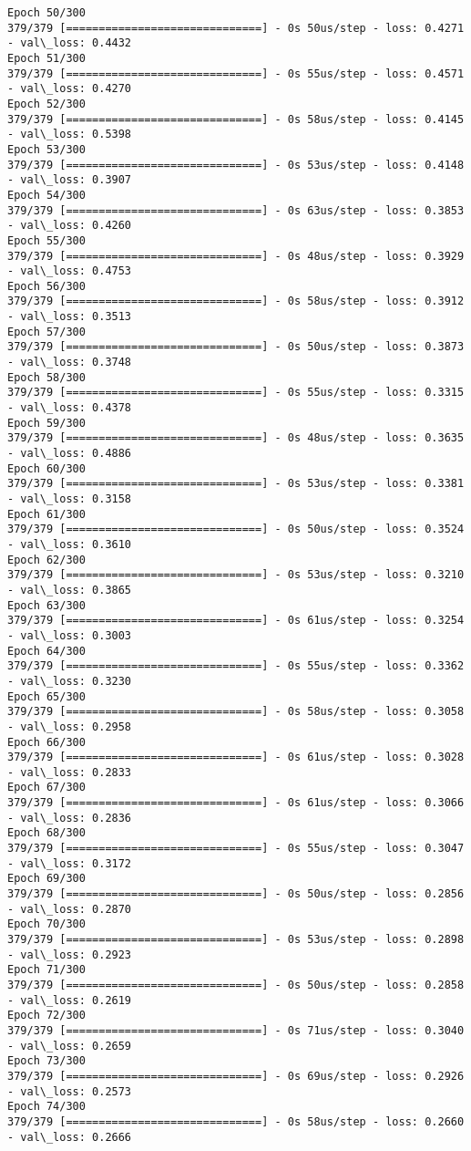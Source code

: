 \documentclass[11pt]{article}
\begin{document}
\begin{Verbatim}[commandchars=\\\{\}]
Epoch 50/300
379/379 [==============================] - 0s 50us/step - loss: 0.4271 - val\_loss: 0.4432
Epoch 51/300
379/379 [==============================] - 0s 55us/step - loss: 0.4571 - val\_loss: 0.4270
Epoch 52/300
379/379 [==============================] - 0s 58us/step - loss: 0.4145 - val\_loss: 0.5398
Epoch 53/300
379/379 [==============================] - 0s 53us/step - loss: 0.4148 - val\_loss: 0.3907
Epoch 54/300
379/379 [==============================] - 0s 63us/step - loss: 0.3853 - val\_loss: 0.4260
Epoch 55/300
379/379 [==============================] - 0s 48us/step - loss: 0.3929 - val\_loss: 0.4753
Epoch 56/300
379/379 [==============================] - 0s 58us/step - loss: 0.3912 - val\_loss: 0.3513
Epoch 57/300
379/379 [==============================] - 0s 50us/step - loss: 0.3873 - val\_loss: 0.3748
Epoch 58/300
379/379 [==============================] - 0s 55us/step - loss: 0.3315 - val\_loss: 0.4378
Epoch 59/300
379/379 [==============================] - 0s 48us/step - loss: 0.3635 - val\_loss: 0.4886
Epoch 60/300
379/379 [==============================] - 0s 53us/step - loss: 0.3381 - val\_loss: 0.3158
Epoch 61/300
379/379 [==============================] - 0s 50us/step - loss: 0.3524 - val\_loss: 0.3610
Epoch 62/300
379/379 [==============================] - 0s 53us/step - loss: 0.3210 - val\_loss: 0.3865
Epoch 63/300
379/379 [==============================] - 0s 61us/step - loss: 0.3254 - val\_loss: 0.3003
Epoch 64/300
379/379 [==============================] - 0s 55us/step - loss: 0.3362 - val\_loss: 0.3230
Epoch 65/300
379/379 [==============================] - 0s 58us/step - loss: 0.3058 - val\_loss: 0.2958
Epoch 66/300
379/379 [==============================] - 0s 61us/step - loss: 0.3028 - val\_loss: 0.2833
Epoch 67/300
379/379 [==============================] - 0s 61us/step - loss: 0.3066 - val\_loss: 0.2836
Epoch 68/300
379/379 [==============================] - 0s 55us/step - loss: 0.3047 - val\_loss: 0.3172
Epoch 69/300
379/379 [==============================] - 0s 50us/step - loss: 0.2856 - val\_loss: 0.2870
Epoch 70/300
379/379 [==============================] - 0s 53us/step - loss: 0.2898 - val\_loss: 0.2923
Epoch 71/300
379/379 [==============================] - 0s 50us/step - loss: 0.2858 - val\_loss: 0.2619
Epoch 72/300
379/379 [==============================] - 0s 71us/step - loss: 0.3040 - val\_loss: 0.2659
Epoch 73/300
379/379 [==============================] - 0s 69us/step - loss: 0.2926 - val\_loss: 0.2573
Epoch 74/300
379/379 [==============================] - 0s 58us/step - loss: 0.2660 - val\_loss: 0.2666

\end{Verbatim}
\end{document}
